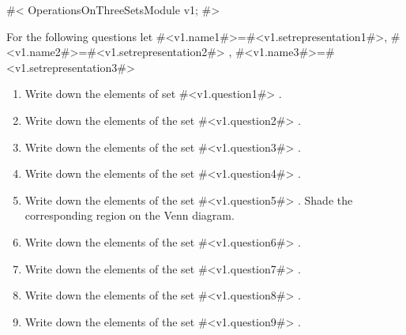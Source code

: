 


#<
OperationsOnThreeSetsModule v1;
#>


For the following questions let \hspace{3mm} #<v1.name1#>=#<v1.setrepresentation1#>, #<v1.name2#>=#<v1.setrepresentation2#> 
, #<v1.name3#>=#<v1.setrepresentation3#>
\begin{enumerate}
\item
Write down the elements of set #<v1.question1#> .
\item
Write down the elements of the set #<v1.question2#> .
\item
Write down the elements of the set #<v1.question3#> .
\item
Write down the elements of the set #<v1.question4#> .
\item
Write down the elements of the set #<v1.question5#> . Shade the corresponding region on the Venn diagram.
\item
Write down the elements of the set #<v1.question6#> .
\item
Write down the elements of the set #<v1.question7#> .
\item
Write down the elements of the set #<v1.question8#> .
\item
Write down the elements of the set #<v1.question9#> .


\end{enumerate}


